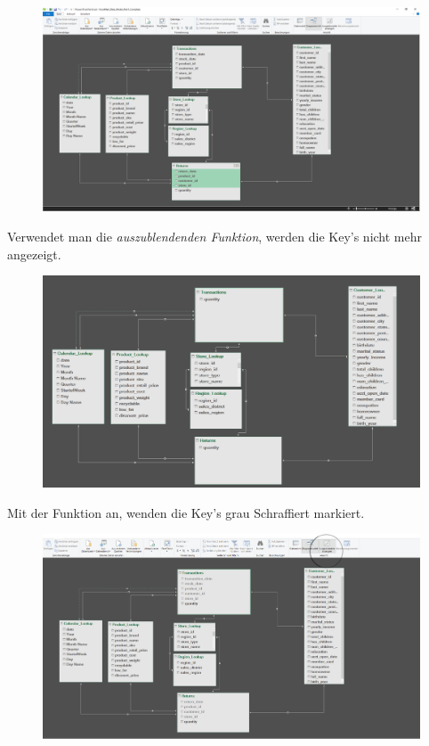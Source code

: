 \begin{figure}[H]
	\centering
	\includegraphics[scale = 0.3]{attachment/chapter_1/screenshot068}
	\caption{}
	\label{fig:screenshot068}
\end{figure}
Verwendet man die \textit{auszublendenden Funktion}, werden die Key's nicht mehr angezeigt. 
\begin{figure}[H]
	\centering
	\includegraphics[scale = 0.3]{attachment/chapter_1/screenshot069}
	\caption{}
	\label{fig:screenshot069}
\end{figure}
Mit der Funktion an, wenden die Key's grau Schraffiert markiert.
\begin{figure}[H]
	\centering
	\includegraphics[scale = 0.3]{attachment/chapter_1/screenshot070}
	\caption{}
	\label{fig:screenshot070}
\end{figure}
